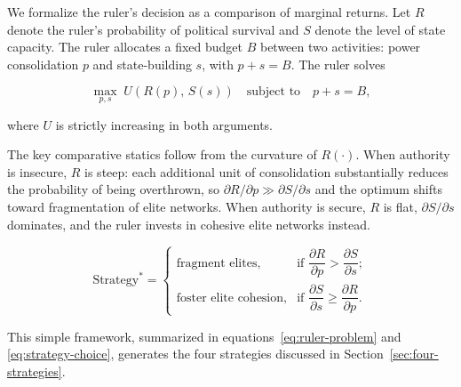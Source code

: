 
We formalize the ruler's decision as a comparison of marginal returns.
Let $R$ denote the ruler's probability of political survival and $S$ denote
the level of state capacity. The ruler allocates a fixed budget $B$ between
two activities: power consolidation $p$ and state-building $s$, with
$p+s=B$. The ruler solves

\begin{equation}
\max_{p,s} \; U(R(p),\, S(s)) \quad \text{subject to} \quad p+s=B,
\label{eq:ruler-problem}
\end{equation}

where $U$ is strictly increasing in both arguments.

The key comparative statics follow from the curvature of $R(\cdot)$.
When authority is insecure, $R$ is steep: each additional unit of
consolidation substantially reduces the probability of being overthrown, so
$\partial R/\partial p \gg \partial S/\partial s$ and the optimum shifts
toward fragmentation of elite networks. When authority is secure, $R$ is
flat, $\partial S/\partial s$ dominates, and the ruler invests in cohesive
elite networks instead.

\begin{equation}
\text{Strategy}^* =
\begin{cases}
\text{fragment elites}, & \text{if } \dfrac{\partial R}{\partial p}
  > \dfrac{\partial S}{\partial s};\\[2ex]
\text{foster elite cohesion}, & \text{if } \dfrac{\partial S}{\partial s}
  \geq \dfrac{\partial R}{\partial p}.
\end{cases}
\label{eq:strategy-choice}
\end{equation}

This simple framework, summarized in equations~\eqref{eq:ruler-problem} and
\eqref{eq:strategy-choice}, generates the four strategies discussed in
Section~\ref{sec:four-strategies}.
